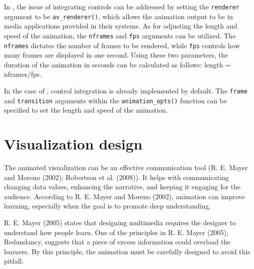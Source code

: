 In , the issue of integrating controls can be addressed by setting the \texttt{renderer} argument to be \texttt{av\_renderer()}, which allows the animation output to be in media applications provided in their systems. As for adjusting the length and speed of the animation, the \texttt{nframes} and \texttt{fps} arguments can be utilized. The \texttt{nframes} dictates the number of frames to be rendered, while \texttt{fps} controls how many frames are displayed in one second. Using these two parameters, the duration of the animation in seconds can be calculated as follows: length = nframes/fps.

In the case of , control integration is already implemented by default. The \texttt{frame} and \texttt{transition} arguments within the \texttt{animation\_opts()} function can be specified to set the length and speed of the animation.

\hypertarget{design}{%
\section{Visualization design}\label{design}}

The animated visualization can be an effective communication tool (R. E. Mayer and Moreno (2002); Robertson et al. (2008)). It helps with communicating changing data values, enhancing the narrative, and keeping it engaging for the audience. According to R. E. Mayer and Moreno (2002), animation can improve learning, especially when the goal is to promote deep understanding.

R. E. Mayer (2005) states that designing multimedia requires the designer to understand how people learn. One of the principles in R. E. Mayer (2005), Redundancy, suggests that a piece of excess information could overload the learners. By this principle, the animation must be carefully designed to avoid this pitfall.

